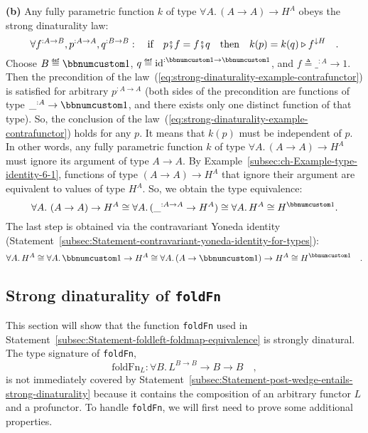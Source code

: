 \textbf{(b)} Any fully parametric function $k$ of type $\forall A.\,\left(A\rightarrow A\right)\rightarrow H^{A}$
obeys the strong dinaturality law:
\begin{equation}
\forall f^{:A\rightarrow B},p^{:A\rightarrow A},q^{:B\rightarrow B}:\quad\text{if}\quad p\bef f=f\bef q\quad\text{then}\quad k(p)=k(q)\triangleright f^{\downarrow H}\quad.\label{eq:strong-dinaturality-example-contrafunctor}
\end{equation}
Choose $B\triangleq\bbnum 1$, $q\triangleq\text{id}^{:\bbnum 1\rightarrow\bbnum 1}$,
and $f\triangleq\_^{:A}\rightarrow1$. Then the precondition of the
law~(\ref{eq:strong-dinaturality-example-contrafunctor}) is satisfied
for arbitrary $p^{:A\rightarrow A}$ (both sides of the precondition
are functions of type $\_^{:A}\rightarrow\bbnum 1$, and there exists
only one distinct function of that type). So, the conclusion of the
law~(\ref{eq:strong-dinaturality-example-contrafunctor}) holds for
any $p$. It means that $k(p)$ must be independent of $p$. In other
words, any fully parametric function $k$ of type $\forall A.\,\left(A\rightarrow A\right)\rightarrow H^{A}$
must ignore its argument of type $A\rightarrow A$. By Example~\ref{subsec:ch-Example-type-identity-6-1},
functions of type $\left(A\rightarrow A\right)\rightarrow H^{A}$
that ignore their argument are equivalent to values of type $H^{A}$.
So, we obtain the type equivalence:
\[
\forall A.\,\left(A\rightarrow A\right)\rightarrow H^{A}\cong\forall A.\,(\_^{:A\rightarrow A}\rightarrow H^{A})\cong\forall A.\,H^{A}\cong H^{\bbnum 1}.
\]
The last step is obtained via the contravariant Yoneda identity (Statement~\ref{subsec:Statement-contravariant-yoneda-identity-for-types}):
\[
\forall A.\,H^{A}\cong\forall A.\,\bbnum 1\rightarrow H^{A}\cong\forall A.\,(A\rightarrow\bbnum 1)\rightarrow H^{A}\cong H^{\bbnum 1}\quad.
\]


\subsection{Strong dinaturality of \texttt{foldFn}}

This section will show that the function \lstinline!foldFn! used
in Statement~\ref{subsec:Statement-foldleft-foldmap-equivalence}
is strongly dinatural. The type signature of \lstinline!foldFn!,
\[
\text{foldFn}_{L}:\forall B.\,L^{B\rightarrow B}\rightarrow B\rightarrow B\quad,
\]
is not immediately covered by Statement~\ref{subsec:Statement-post-wedge-entails-strong-dinaturality}
because it contains the composition of an arbitrary functor $L$ and
a profunctor. To handle \lstinline!foldFn!, we will first need to
prove some additional properties.

